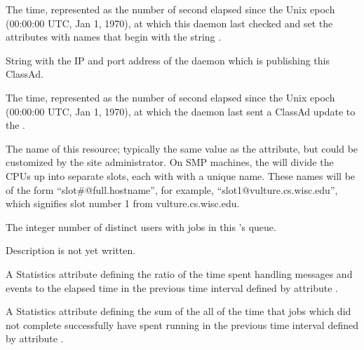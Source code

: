 \begin{description}
\item[\AdAttr{MonitorSelfTime}:] The  time, represented as the number of
  second elapsed since the Unix epoch (00:00:00 UTC, Jan 1, 1970),
  at which this daemon last checked and set the attributes with names that
  begin with the string .
  
\item[\AdAttr{MyAddress}:] String with the IP and port address of the
 daemon which is publishing this ClassAd.

\item[\AdAttr{MyCurrentTime}:]  The time, represented as the number of 
  second elapsed since the Unix epoch (00:00:00 UTC, Jan 1, 1970),
  at which the  daemon last sent a ClassAd update to the
  .

\item[\AdAttr{Name}:] The name of this resource; typically the same value as
  the  attribute, but could be customized by the site
  administrator.
  On SMP machines, the  will divide the CPUs up into separate
  slots, each with with a unique name.
  These names will be of the form ``slot\#@full.hostname'', for example,
  ``slot1@vulture.cs.wisc.edu'', which signifies slot number 1 from
  vulture.cs.wisc.edu.

\item[\AdAttr{NumUsers}:] The integer number of distinct users with jobs in
  this 's queue.

\item[\AdAttr{PublicNetworkIpAddr}:] Description is not yet written.

\item[\AdAttr{RecentDaemonCoreDutyCycle}:] A Statistics attribute defining
  the ratio of the time spent 
  handling messages and events to the elapsed time 
  in the previous time interval defined by attribute .

\item[\AdAttr{RecentJobsAccumBadputTime}:] A Statistics attribute defining
  the sum of the all of the time that jobs which did not complete successfully 
  have spent running 
  in the previous time interval defined by attribute .



\end{description}

